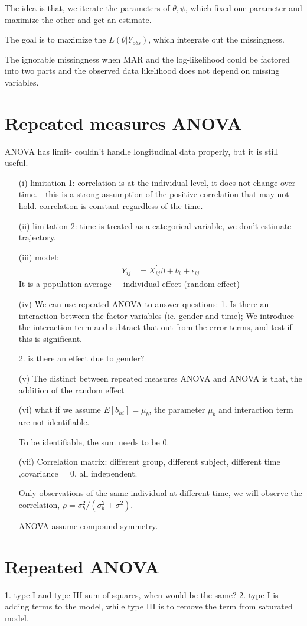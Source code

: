 The idea is that, we iterate the parameters of $\theta, \psi$, which fixed one parameter and maximize the other and get an estimate. 

The goal is to maximize the $L(\theta | Y_{obs})$, which integrate out the missingness. 

The ignorable missingness when MAR and the log-likelihood could be factored into two parts and the observed data likelihood does not depend on missing variables.


\section{Repeated measures ANOVA}

ANOVA has limit- couldn't handle longitudinal data properly, but it is still useful.
\begin{itemize}
\item[(i)] limitation 1: correlation is at the individual level, it does not change over time. - this is a strong assumption of the positive correlation that may not hold. 
correlation is constant regardless of the time.

\item[(ii)] limitation 2: time is treated as a categorical variable, we don't estimate trajectory.

\item[(iii)] model: 
\begin{align*}
Y_{ij} &= X_{ij}^{'} \beta + b_i + \epsilon_{ij}

\end{align*}
It is a population average + individual effect (random effect)

\item[(iv)] We can use repeated ANOVA to answer questions:
1. Is there an interaction between the factor variables (ie. gender and time); 
We introduce the interaction term and subtract that out from the error terms, and test if this is significant.

2. is there an effect due to gender?

\item[(v)] The distinct between repeated measures ANOVA and ANOVA is that, the addition of the random effect


\item[(vi)] what if we assume $E[b_{hi}] = \mu_b$, the parameter $\mu_b$ and interaction term are not identifiable. 

To be identifiable, the sum needs to be 0.

\item[(vii)] Correlation matrix:
different group, different subject, different time ,covariance = 0, all independent.

Only observations of the same individual at different time, we will observe the correlation, $\rho = \sigma_b^2/(\sigma_b^2 + \sigma^2)$.

ANOVA assume compound symmetry. 

\end{itemize}

\section{Repeated ANOVA}

1. type I and type III sum of squares, when would be the same?
2. type I is adding terms to the model, while type III is to remove the term from saturated model. 

